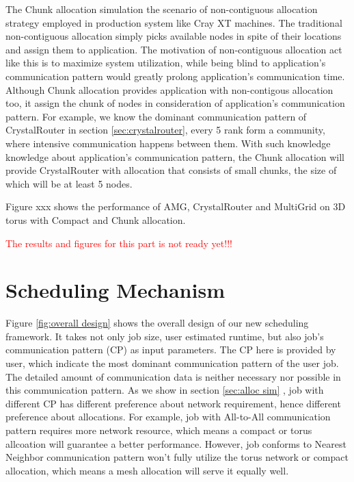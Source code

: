 \documentclass[conference]{IEEEtran}
\begin{document}
The Chunk allocation simulation the scenario of non-contiguous allocation strategy employed in production system like Cray XT machines. The traditional non-contiguous allocation simply picks available nodes in spite of their locations and assign them to application. The motivation of non-contiguous allocation act like this is to maximize system utilization, while being blind to application's communication pattern would greatly prolong application's communication time. Although Chunk allocation provides application with non-contigous allocation too, it assign the chunk of nodes in consideration of application's communication pattern. For example, we know the dominant communication pattern of CrystalRouter in section \ref{sec:crystalrouter}, every 5 rank form a community, where intensive communication happens between them. With such knowledge knowledge about application's communication pattern, the Chunk allocation will provide CrystalRouter with allocation that consists of small chunks, the size of which will be at least 5 nodes. 

Figure xxx shows the performance of AMG, CrystalRouter and MultiGrid on 3D torus with Compact and Chunk allocation. 


\textcolor{red}{The results and figures for this part is not ready yet!!!}



\iffalse

\section{Scheduling Mechanism}
\label{sec:scheduling mechanism}

Figure \ref{fig:overall design} shows the overall design of our new scheduling framework. It takes not only job size, user estimated runtime, but also job's communication pattern (CP) as input parameters. The CP here is provided by user, which indicate the most dominant communication pattern of the user job. The detailed amount of communication data is neither necessary nor possible in this communication pattern. As we show in section \ref{sec:alloc sim} , job with different CP has different preference about network requirement, hence different preference about allocations. For example, job with All-to-All communication pattern requires more network resource, which means a compact or torus allcoation will guarantee a better performance. However, job conforms to Nearest Neighbor communication pattern won't fully utilize the torus network or compact allocation, which means a mesh allocation will serve it equally well.
\end{document}
